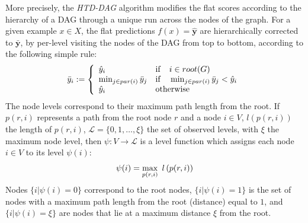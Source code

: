 \documentclass{bioinfo}
\newcommand{\by}{\boldsymbol{y}}
\begin{document}
\begin{methods}
More precisely, the  {\em HTD-DAG} algorithm modifies the flat scores according to the hierarchy of a DAG through a unique run across the nodes of the graph. For a given example $x \in X$, the flat predictions $f(x) = \hat{\by}$ are hierarchically corrected to $\bar{\by}$, by per-level visiting the nodes of the DAG from top to bottom, according to the following simple rule:
\begin{equation}
\bar{y}_i := \left\{
                 \begin{array}{lll}
				   \hat{y}_i  & {\rm if} \quad i \in root(G) \\
                   \min_{j \in par(i)} \bar{y}_j & {\rm if} \quad \min_{j \in par(i)} \bar{y}_j < \hat{y}_i \\
                   \hat{y}_i & {\rm otherwise}
                 \end{array}
                \right.
\label{eq:HTD} 
\end{equation}
The node levels correspond to their maximum path length from the root. 
If $p(r,i)$ represents a path from the root node $r$ and a node $i \in V$, $l \left(p(r,i)\right)$  the length of $p(r,i)$, $\mathcal L = \{0, 1, \ldots, \xi \}$ the set of observed levels, with $\xi$  the maximum node level, then $\psi: V \longrightarrow \mathcal L$ is a level function which assigns each node $i\in V$ to its level $\psi(i)$:
\vspace*{-5pt}
\begin{equation}
\psi(i) = \max_{p(r,i)}\ l \left(p(r,i)\right)
\label{eq:psi}
\vspace*{-5pt}
\end{equation}
Nodes $ \{i | \psi(i) = 0 \}$ correspond to the root nodes, $ \{i | \psi(i) = 1 \}$ is the set of nodes  with a maximum path length from the root (distance) equal to $1$, and $ \{i | \psi(i) = \xi \}$ are nodes that lie at a maximum distance $\xi$ from the root.


\begin{figure}[!hb]
\begin{center}
\cornersize*{8pt}
\end{center}
\end{figure}
\end{methods}
\end{document}
